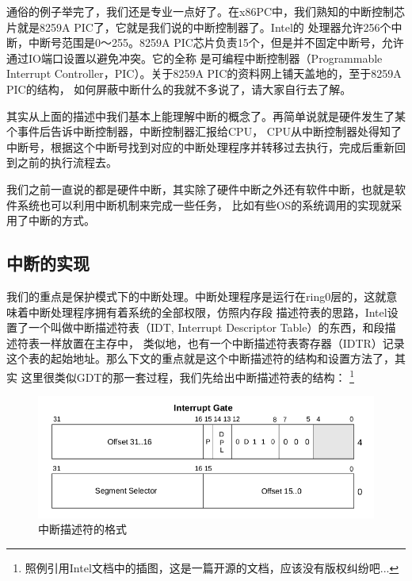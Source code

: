\par 通俗的例子举完了，我们还是专业一点好了。在x86PC中，我们熟知的中断控制芯片就是8259A PIC了，它就是我们说的中断控制器了。Intel的\allowbreak
处理器允许256个中断，中断号范围是0～255。8259A PIC芯片负责15个，但是并不固定中断号，允许通过IO端口设置以避免冲突。它的全称\allowbreak
是可编程中断控制器（Programmable Interrupt Controller，PIC）。关于8259A PIC的资料网上铺天盖地的，至于8259A PIC的结构，\allowbreak
如何屏蔽中断什么的我就不多说了，请大家自行去了解。

\par 其实从上面的描述中我们基本上能理解中断的概念了。再简单说就是硬件发生了某个事件后告诉中断控制器，中断控制器汇报给CPU，\allowbreak
CPU从中断控制器处得知了中断号，根据这个中断号找到对应的中断处理程序并转移过去执行，完成后重新回到之前的执行流程去。

\par 我们之前一直说的都是硬件中断，其实除了硬件中断之外还有软件中断，也就是软件系统也可以利用中断机制来完成一些任务，\allowbreak
比如有些OS的系统调用的实现就采用了中断的方式。

\subsection{中断的实现}

\par 我们的重点是保护模式下的中断处理。中断处理程序是运行在ring0层的，这就意味着中断处理程序拥有着系统的全部权限，仿照内存段\allowbreak
描述符表的思路，Intel设置了一个叫做中断描述符表（IDT, Interrupt Descriptor Table）的东西，和段描述符表一样放置在主存中，\allowbreak
类似地，也有一个中断描述符表寄存器（IDTR）记录这个表的起始地址。那么下文的重点就是这个中断描述符的结构和设置方法了，其实\allowbreak
这里很类似GDT的那一套过程，我们先给出中断描述符表的结构：\allowbreak
\footnote{照例引用Intel文档中的插图，这是一篇开源的文档，应该没有版权纠纷吧...}

\begin{figure}[H]
      \centering
      \includegraphics[scale=0.5]{picture/chapt7/interrupt_gate.png}
      \caption{中断描述符的格式}
\end{figure}

